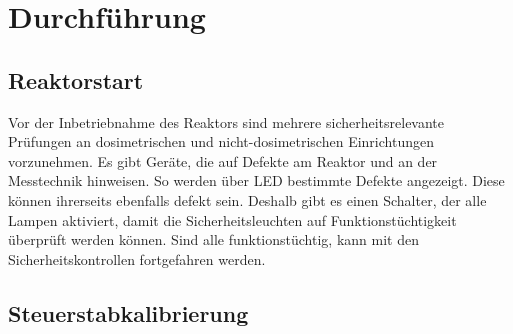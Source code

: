\section{Durchführung}
    \subsection{Reaktorstart}
    Vor der Inbetriebnahme des Reaktors sind mehrere sicherheitsrelevante Prüfungen an dosimetrischen und nicht-dosimetrischen Einrichtungen vorzunehmen. Es gibt Geräte, die auf Defekte am Reaktor und an der Messtechnik hinweisen. So werden über LED bestimmte Defekte angezeigt. Diese können ihrerseits ebenfalls defekt sein. Deshalb gibt es einen Schalter, der alle Lampen aktiviert, damit die Sicherheitsleuchten auf Funktionstüchtigkeit überprüft werden können. Sind alle funktionstüchtig, kann mit den Sicherheitskontrollen fortgefahren werden.
    
    \subsection{Steuerstabkalibrierung}

